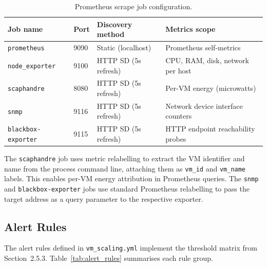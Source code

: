 \documentclass[12pt,a4paper]{report}
\begin{document}
\begin{table}[htbp]
\centering
\caption{Prometheus scrape job configuration.}
\label{tab:scrape_targets}
\begin{tabular}{L{3.5cm} C{2cm} L{3cm} L{4.5cm}}
\toprule
\textbf{Job name} & \textbf{Port} & \textbf{Discovery method} & \textbf{Metrics scope} \\
\midrule
\texttt{prometheus}          & 9090 & Static (localhost)          & Prometheus self-metrics \\
\texttt{node\_exporter}      & 9100 & HTTP SD (5s refresh)        & CPU, RAM, disk, network per host \\
\texttt{scaphandre}          & 8080 & HTTP SD (5s refresh)        & Per-VM energy (microwatts) \\
\texttt{snmp}                & 9116 & HTTP SD (5s refresh)        & Network device interface counters \\
\texttt{blackbox-exporter}   & 9115 & HTTP SD (5s refresh)        & HTTP endpoint reachability probes \\
\bottomrule
\end{tabular}
\end{table}

The \texttt{scaphandre} job uses metric relabelling to extract the VM identifier and
name from the process command line, attaching them as \texttt{vm\_id} and
\texttt{vm\_name} labels. This enables per-VM energy attribution in Prometheus
queries. The \texttt{snmp} and \texttt{blackbox-exporter} jobs use standard
Prometheus relabelling to pass the target address as a query parameter to the
respective exporter.

\subsection{Alert Rules}

The alert rules defined in \texttt{vm\_scaling.yml} implement the threshold matrix
from Section~2.5.3. Table~\ref{tab:alert_rules} summarises each rule group.
\end{document}

